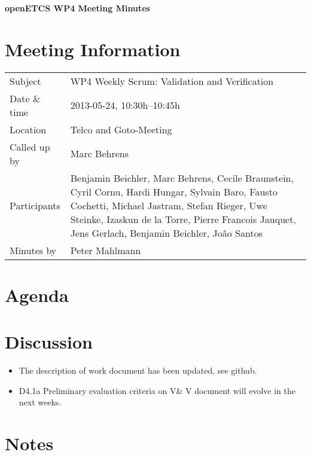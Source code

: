 \documentclass[a4paper, 11pt]{article}
\begin{document}
{\begin{center}\huge\bf openETCS WP4 Meeting Minutes\end{center}}
\section{Meeting Information}

\renewcommand{\arraystretch}{1.5}
\begin{supertabular}{m{.2\textwidth}m{.8\textwidth}}
Subject & WP4 Weekly Scrum: Validation and Verification\\
Date \& time & 2013-05-24, 10:30h--10:45h\\
Location & Telco and Goto-Meeting\\
Called up by & Marc Behrens\\
Participants &
Benjamin Beichler,
Marc Behrens,
Cecile Braunstein,
Cyril Cornu,
Hardi Hungar,
Sylvain Baro,
Fausto Cochetti,
Michael Jastram,
Stefan Rieger,
Uwe Steinke,
Izaskun de la Torre,
Pierre Francois Jauquet,
Jens Gerlach,
Benjamin Beichler,
Jo\~ao Santos\\



Minutes by & Peter Mahlmann\\

\end{supertabular}
\renewcommand{\arraystretch}{1.0}


\section{{Agenda}}

\section{Discussion}
\begin{itemize}
\item The description of work document has been updated, see github.
\item D4.1a Preliminary evaluation criteria on V\& V document will evolve in the next weeks.
\end{itemize}


\section{Notes}
\end{document}
